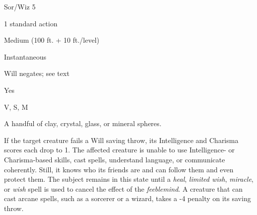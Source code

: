 
\begin{description*}
\item[Level:] Sor/Wiz 5
\item[Casting Time:] 1 standard action
\item[Range:] Medium (100 ft. + 10 ft./level)
\item[Duration:] Instantaneous
\item[Saving Throw:] Will negates; see text
\item[Spell Resistance:] Yes
\item[Components:] V, S, M
\item[Arcane Material Component:] A handful of clay, crystal, glass, or mineral spheres.
\end{description*}

If the target creature fails a Will saving throw, its Intelligence and Charisma
scores each drop to 1. The affected creature is unable to use Intelligence- or
Charisma-based skills, cast spells, understand language, or communicate coherently.
Still, it knows who its friends are and can follow them and even protect them.
The subject remains in this state until a \textit{heal}, \textit{limited wish},
\textit{miracle}, or \textit{wish} spell is used to cancel the effect of the \textit{feeblemind}.
A creature that can cast arcane spells, such as a sorcerer or a wizard, takes a
-4 penalty on its saving throw.